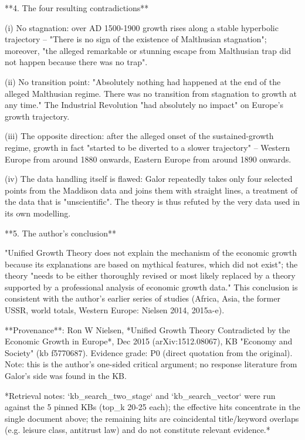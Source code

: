 \documentclass[10pt]{article}
\begin{document}
\begin{AnswerText}
**4. The four resulting contradictions**

(i) No stagnation: over AD 1500-1900 growth rises along a stable hyperbolic trajectory -- "There is no sign of the existence of Malthusian stagnation"; moreover, "the alleged remarkable or stunning escape from Malthusian trap did not happen because there was no trap".

(ii) No transition point: "Absolutely nothing had happened at the end of the alleged Malthusian regime. There was no transition from stagnation to growth at any time." The Industrial Revolution "had absolutely no impact" on Europe's growth trajectory.

(iii) The opposite direction: after the alleged onset of the sustained-growth regime, growth in fact "started to be diverted to a slower trajectory" -- Western Europe from around 1880 onwards, Eastern Europe from around 1890 onwards.

(iv) The data handling itself is flawed: Galor repeatedly takes only four selected points from the Maddison data and joins them with straight lines, a treatment of the data that is "unscientific". The theory is thus refuted by the very data used in its own modelling.

**5. The author's conclusion**

"Unified Growth Theory does not explain the mechanism of the economic growth because its explanations are based on mythical features, which did not exist"; the theory "needs to be either thoroughly revised or most likely replaced by a theory supported by a professional analysis of economic growth data." This conclusion is consistent with the author's earlier series of studies (Africa, Asia, the former USSR, world totals, Western Europe: Nielsen 2014, 2015a-e).

**Provenance**: Ron W Nielsen, *Unified Growth Theory Contradicted by the Economic Growth in Europe*, Dec 2015 (arXiv:1512.08067), KB "Economy and Society" (kb f5770687). Evidence grade: P0 (direct quotation from the original). Note: this is the author's one-sided critical argument; no response literature from Galor's side was found in the KB.

*Retrieval notes: `kb_search_two_stage` and `kb_search_vector` were run against the 5 pinned KBs (top_k 20-25 each); the effective hits concentrate in the single document above; the remaining hits are coincidental title/keyword overlaps (e.g. leisure class, antitrust law) and do not constitute relevant evidence.*
\end{AnswerText}
\end{document}
